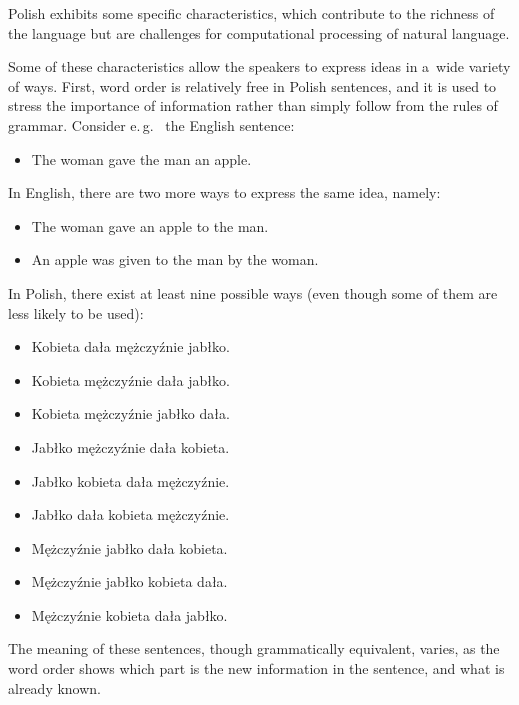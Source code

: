\begin{multicols}{2}
Polish exhibits some specific characteristics, which contribute to the
richness of the language \cite{Pisarek2007} but are challenges for
computational processing of natural language. 


Some of these characteristics allow the speakers to express ideas in
a~wide variety of ways. First, word order is relatively free in Polish
sentences, and it is used to stress the importance of information
rather than simply follow from the rules of grammar. Consider e.\,g.~
the English sentence: 

\begin{itemize} \item The woman gave the man an apple. \end{itemize} 

In English, there are two more ways to express the same idea, namely:
\begin{itemize} \item The woman gave an apple to the man. \item An
apple was given to the man by the woman. \end{itemize} 

In Polish, there exist at least nine possible ways (even though some
of them are less likely to be used): 

\begin{itemize} \item Kobieta dała mężczyźnie jabłko. \item
Kobieta mężczyźnie dała jabłko. \item Kobieta mężczyźnie
jabłko dała. \item Jabłko mężczyźnie dała kobieta. \item
Jabłko kobieta dała mężczyźnie. \item Jabłko dała kobieta
mężczyźnie. \item Mężczyźnie jabłko dała kobieta. \item
Mężczyźnie jabłko kobieta dała. \item Mężczyźnie kobieta dała
jabłko. \end{itemize} 

The meaning of these sentences, though grammatically equivalent,
varies, as the word order shows which part is the new information in
the sentence, and what is already known. 



\end{multicols}
